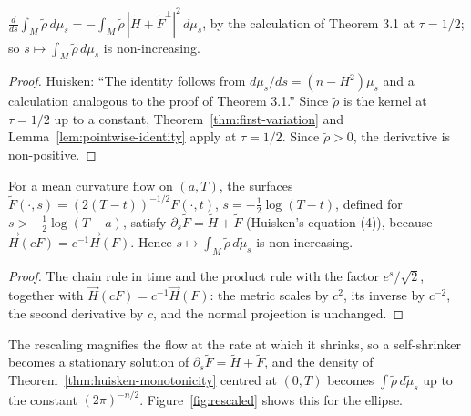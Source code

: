 \begin{corollary}
  \label{cor:rescaled}
  \leanok
  $\frac{d}{ds}\int_M \tilde\rho\,d\mu_s = -\int_M \tilde\rho\,|\tilde H + \tilde F^\perp|^2\,d\mu_s$,
  by the calculation of Theorem 3.1 at $\tau = 1/2$; so $s \mapsto \int_M \tilde\rho\,d\mu_s$
  is non-increasing.
\end{corollary}

\begin{proof}
  \leanok
  Huisken: ``The identity follows from $d\mu_s/ds = (n - H^2)\mu_s$ and a calculation analogous to the proof of Theorem 3.1.'' Since $\tilde\rho$ is the kernel at $\tau = 1/2$ up to a constant, Theorem~\ref{thm:first-variation} and Lemma~\ref{lem:pointwise-identity} apply at $\tau = 1/2$. Since $\tilde\rho > 0$, the derivative is non-positive.
\end{proof}

\begin{theorem}
  \label{thm:rescaling}
  \leanok
  For a mean curvature flow on $(a, T)$, the surfaces
  $\tilde F(\cdot, s) = (2(T - t))^{-1/2} F(\cdot, t)$, $s = -\tfrac12 \log(T - t)$, defined
  for $s > -\tfrac12 \log(T - a)$, satisfy $\partial_s \tilde F = \tilde H + \tilde F$
  (Huisken's equation (4)), because $\vec H(cF) = c^{-1} \vec H(F)$. Hence
  $s \mapsto \int_M \tilde\rho\,d\tilde\mu_s$ is non-increasing.
\end{theorem}

\begin{proof}
  \leanok
  The chain rule in time and the product rule with the factor $e^s/\sqrt2$, together with $\vec H(cF) = c^{-1}\vec H(F)$: the metric scales by $c^2$, its inverse by $c^{-2}$, the second derivative by $c$, and the normal projection is unchanged.
\end{proof}

The rescaling magnifies the flow at the rate at which it shrinks, so a self-shrinker becomes
a stationary solution of $\partial_s \tilde F = \tilde H + \tilde F$, and the density of
Theorem~\ref{thm:huisken-monotonicity} centred at $(0, T)$ becomes $\int \tilde\rho\,d\tilde\mu_s$
up to the constant $(2\pi)^{-n/2}$. Figure~\ref{fig:rescaled} shows this for the ellipse.


